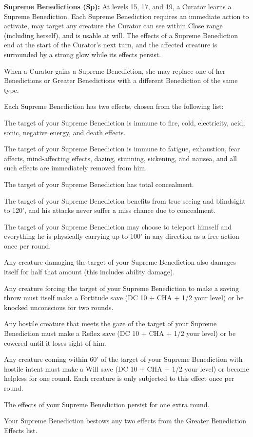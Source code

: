 \textbf{Supreme Benedictions (Sp):} At levels 15, 17, and 19, a Curator learns a Supreme Benediction. Each Supreme Benediction requires an immediate action to activate, may target any creature the Curator can see within Close range (including herself), and is usable at will. The effects of a Supreme Benediction end at the start of the Curator's next turn, and the affected creature is surrounded by a strong glow while its effects persist.

When a Curator gains a Supreme Benediction, she may replace one of her Benedictions or Greater Benedictions with a different Benediction of the same type.

Each Supreme Benediction has two effects, chosen from the following list:
\begin{itemize*}
\item The target of your Supreme Benediction is immune to fire, cold, electricity, acid, sonic, negative energy, and death effects.
\item The target of your Supreme Benediction is immune to fatigue, exhaustion, fear affects, mind-affecting effects, dazing, stunning, sickening, and nausea, and all such effects are immediately removed from him.
\item The target of your Supreme Benediction has total concealment.
\item The target of your Supreme Benediction benefits from true seeing and blindsight to 120', and his attacks never suffer a miss chance due to concealment.
\item The target of your Supreme Benediction may choose to teleport himself and everything he is physically carrying up to 100' in any direction as a free action once per round.
\item Any creature damaging the target of your Supreme Benediction also damages itself for half that amount (this includes ability damage).
\item Any creature forcing the target of your Supreme Benediction to make a saving throw must itself make a Fortitude save (DC 10 + CHA + 1/2 your level) or be knocked unconscious for two rounds.
\item Any hostile creature that meets the gaze of the target of your Supreme Benediction must make a Reflex save (DC 10 + CHA + 1/2 your level) or be cowered until it loses sight of him.
\item Any creature coming within 60' of the target of your Supreme Benediction with hostile intent must make a Will save (DC 10 + CHA + 1/2 your level) or become helpless for one round. Each creature is only subjected to this effect once per round.
\item The effects of your Supreme Benediction persist for one extra round.
\item Your Supreme Benediction bestows any two effects from the Greater Benediction Effects list.
\end{itemize*}


